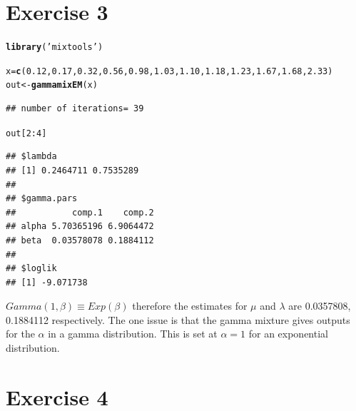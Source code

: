 \documentclass{article}\usepackage[]{graphicx}\usepackage[]{color}
\makeatletter
\newcommand{\hlnum}[1]{\textcolor[rgb]{0.686,0.059,0.569}{#1}}%
\newcommand{\hlstr}[1]{\textcolor[rgb]{0.192,0.494,0.8}{#1}}%
\newcommand{\hlopt}[1]{\textcolor[rgb]{0,0,0}{#1}}%
\newcommand{\hlstd}[1]{\textcolor[rgb]{0.345,0.345,0.345}{#1}}%
\newcommand{\hlkwb}[1]{\textcolor[rgb]{0.69,0.353,0.396}{#1}}%
\newcommand{\hlkwd}[1]{\textcolor[rgb]{0.737,0.353,0.396}{\textbf{#1}}}%
\newenvironment{kframe}{%
 \def\at@end@of@kframe{}%
 \ifinner\ifhmode%
  \def\at@end@of@kframe{\end{minipage}}%
  \begin{minipage}{\columnwidth}%
 \fi\fi%
 \def\FrameCommand##1{\hskip\@totalleftmargin \hskip-\fboxsep
 \colorbox{shadecolor}{##1}\hskip-\fboxsep
     \hskip-\linewidth \hskip-\@totalleftmargin \hskip\columnwidth}%
 \MakeFramed {\advance\hsize-\width
   \@totalleftmargin\z@ \linewidth\hsize
   \@setminipage}}%
 {\par\unskip\endMakeFramed%
 \at@end@of@kframe}
\newenvironment{knitrout}{}{} %
\makeatother
\begin{document}
\section*{Exercise 3}
\begin{knitrout}
\color{fgcolor}\begin{kframe}
\begin{alltt}
\hlkwd{library}\hlstd{(}\hlstr{'mixtools'}\hlstd{)}
\end{alltt}


{\ttfamily\noindent\itshape\color{messagecolor}{\#\# mixtools package, version 1.0.4, Released 2016-01-11\\\#\# This package is based upon work supported by the National Science Foundation under Grant No. SES-0518772.}}\begin{alltt}
\hlstd{x} \hlkwb{=} \hlkwd{c}\hlstd{(}\hlnum{0.12}\hlstd{,}\hlnum{0.17}\hlstd{,}\hlnum{0.32}\hlstd{,}\hlnum{0.56}\hlstd{,}\hlnum{0.98}\hlstd{,}\hlnum{1.03}\hlstd{,}\hlnum{1.10}\hlstd{,}\hlnum{1.18}\hlstd{,} \hlnum{1.23}\hlstd{,} \hlnum{1.67}\hlstd{,} \hlnum{1.68}\hlstd{,} \hlnum{2.33}\hlstd{)}
\hlstd{out} \hlkwb{<-} \hlkwd{gammamixEM}\hlstd{(x)}
\end{alltt}
\begin{verbatim}
## number of iterations= 39
\end{verbatim}
\begin{alltt}
\hlstd{out[}\hlnum{2}\hlopt{:}\hlnum{4}\hlstd{]}
\end{alltt}
\begin{verbatim}
## $lambda
## [1] 0.2464711 0.7535289
## 
## $gamma.pars
##           comp.1    comp.2
## alpha 5.70365196 6.9064472
## beta  0.03578078 0.1884112
## 
## $loglik
## [1] -9.071738
\end{verbatim}
\end{kframe}
\end{knitrout}

$Gamma(1, \beta) \equiv Exp(\beta)$ therefore the estimates for $\mu$ and $\lambda$ are 0.0357808, 0.1884112 respectively. The one issue is that the gamma mixture gives outputs for the $\alpha$ in a gamma distribution. This is set at $\alpha = 1$ for an exponential distribution.
\section*{Exercise 4}
\end{document}
